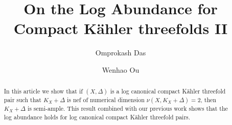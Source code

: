 \documentclass[12pt]{amsart}
\author{Omprokash Das}
\author{Wenhao Ou}
\date{}
\newcommand{\<}{\leq}
\theoremstyle{remark}
\theoremstyle{definition}
\theoremstyle{definition}
\numberwithin{equation}{section}
\theoremstyle{definition}
\theoremstyle{definition}
\begin{document}
\title{On the Log Abundance for Compact {K\"ahler} threefolds II}
\maketitle


\begin{otherlanguage}{english}
  \begin{abstract}
    In this article we show that if $(X, \Delta)$ is a log canonical compact K\"ahler threefold pair such that $K_X+\Delta$ is nef of numerical dimension $\nu(X, K_X+\Delta)=2$, then $K_X+\Delta$ is semi-ample. This result combined with our previous work   shows that the log abundance holds for log canonical compact K\"ahler threefold pairs.
  \end{abstract}
  \end{otherlanguage}






  






\end{document}
